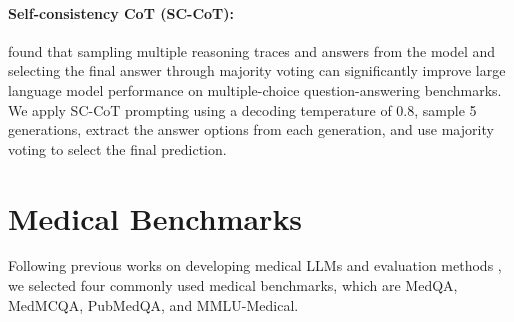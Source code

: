 \documentclass{article}
\newcommand{\mtron}{\textsc{MediTron}\xspace}
\begin{document}
\paragraph{Self-consistency CoT (SC-CoT):} \citet{wang2023selfconsistency} found that sampling multiple reasoning traces and answers from the model and selecting the final answer through majority voting can significantly improve large language model performance on multiple-choice question-answering benchmarks. We apply SC-CoT prompting using a decoding temperature of 0.8, sample 5 generations, extract the answer options from each generation, and use majority voting to select the final prediction.  
\begin{table}
    \centering
    \small
    \caption{\textbf{Medical benchmark datasets.} In this table, we summarize the major details of each benchmark we use to evaluate \mtron. We report the number of train and test questions, the format of the questions, and the number of choices for each benchmark. Note that all benchmarks are multiple-choice question-answering tasks. For MedQA-4-option, we train on the 5-option variant and evaluate on the 4-option setting.}
    \label{tab:dataset_info}
    \vspace{-5mm}
\end{table}
 
\section{Medical Benchmarks}\label{sec:medical_benchmarks}
Following previous works on developing medical LLMs and evaluation methods \citep{wu2023pmcllama,medpalm, medpalm2}, we selected four commonly used medical benchmarks, which are MedQA, MedMCQA, PubMedQA, and MMLU-Medical. 
\end{document}
